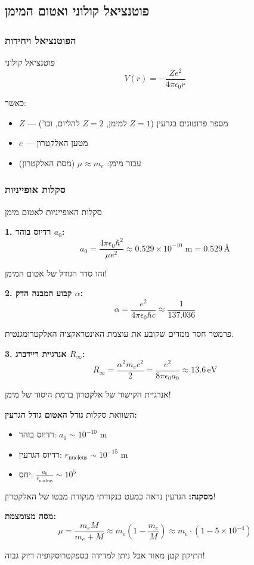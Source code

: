 \subsection{פוטנציאל קולוני ואטום המימן}

\subsubsection{הפוטנציאל ויחידות}

\begin{definitionbox}{פוטנציאל קולוני}
\[
V(r) = -\frac{Ze^2}{4\pi\epsilon_0 r}
\]

כאשר:
\begin{itemize}
    \item $Z$ — מספר פרוטונים בגרעין ($Z=1$ למימן, $Z=2$ להליום, וכו')
    \item $e$ — מטען האלקטרון
    \item עבור מימן: $\mu \approx m_e$ (מסת האלקטרון)
\end{itemize}
\end{definitionbox}

\subsubsection{סקלות אופייניות}

\begin{theorembox}{סקלות האופייניות לאטום מימן}

\textbf{1. רדיוס בוהר $a_0$:}
\[
a_0 = \frac{4\pi\epsilon_0\hbar^2}{\mu e^2} \approx 0.529 \times 10^{-10} \text{ m} = 0.529 \, \text{\AA}
\]

זהו סדר הגודל של אטום המימן!

\textbf{2. קבוע המבנה הדק $\alpha$:}
\[
\alpha = \frac{e^2}{4\pi\epsilon_0\hbar c} \approx \frac{1}{137.036}
\]

פרמטר חסר ממדים שקובע את עוצמת האינטראקציה האלקטרומגנטית.

\textbf{3. אנרגיית ריידברג $R_\infty$:}
\[
R_\infty = \frac{\alpha^2 m_e c^2}{2} = \frac{e^2}{8\pi\epsilon_0 a_0} \approx 13.6 \, \text{eV}
\]

אנרגיית הקישור של אלקטרון ברמת היסוד של מימן!
\end{theorembox}

\begin{examplebox}{השוואת סקלות}
\textbf{גודל האטום  גודל הגרעין:}
\begin{itemize}
    \item רדיוס בוהר: $a_0 \sim 10^{-10}$ m
    \item רדיוס הגרעין: $r_{\text{nucleus}} \sim 10^{-15}$ m
    \item יחס: $\frac{a_0}{r_{\text{nucleus}}} \sim 10^5$
\end{itemize}

\textbf{מסקנה:} הגרעין נראה כמעט כנקודתי מנקודת מבטו של האלקטרון!

\textbf{מסה מצומצמת:}
\[
\mu = \frac{m_e M}{m_e + M} \approx m_e\left(1 - \frac{m_e}{M}\right) \approx m_e \cdot (1 - 5\times10^{-4})
\]

התיקון קטן מאוד אבל ניתן למדידה בספקטרוסקופיה דיוק גבוה!
\end{examplebox}


